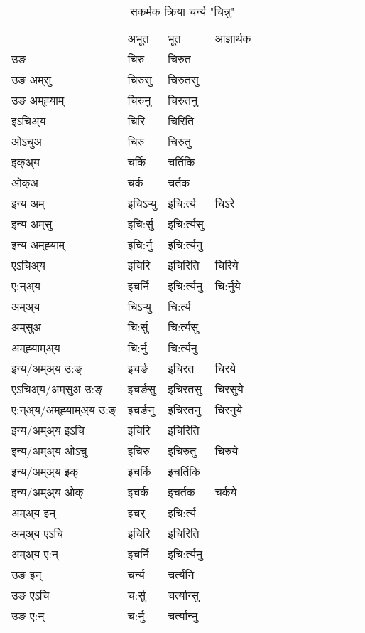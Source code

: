 \begin{table}[H]
\centering
\caption{\label{ir.vt} सकर्मक क्रिया  चर्न्य  "चिन्नु"  }
\begin{tabular}{l|l|l|l|l|l|l|l|l|l|l|l|l}  \toprule
&अभूत & भूत & आज्ञार्थक \\ 
उङ &चिरु &चिरुत \\ 
उङ अम्‌सु &चिरुसु &चिरुतसु \\ 
उङ अम्‌ह्‍याम् &चिरुनु &चिरुतनु \\ 
इऽचिअ्य &चिरि &चिरिति   \\ 
ओऽचुअ &चिरु &चिरुतु   \\ 
इक्अ्य &चर्कि &चर्तिकि   \\ 
ओक्अ &चर्क &चर्तक   \\ 
इन्य अम् & इचिऽर्‍यु  & इचि:र्त्य &चिऽरे  \\ 
इन्य अम्‌सु & इचि:र्सु  & इचि:र्त्यसु   \\ 
इन्य अम्‌ह्‍याम् & इचि:र्नु  & इचि:र्त्यनु   \\ 
एऽचिअ्य & इचिरि & इचिरिति &चिरिये    \\ 
ए:न्अ्य & इचर्नि  & इचि:र्त्यनु &चि:र्नुये  \\ 
अम्अ्य & चिऽर्‍यु  & चि:र्त्य  \\ 
अम्‌सुअ & चि:र्सु & चि:र्त्यसु  \\ 
अम्‌ह्‍याम्अ्य & चि:र्नु  & चि:र्त्यनु \\ 
\midrule
इन्य/अम्अ्य उ:ङ्‌&इचर्ङ & इचिरत &चिरये \\ 
एऽचिअ्य/अम्‌सुअ उ:ङ्‌ &इचर्ङसु & इचिरतसु &चिरसुये \\ 
ए:न्अ्य/अम्‌ह्‍याम्अ्य उ:ङ्‌ &इचर्ङनु & इचिरतनु &चिरनुये \\ 
इन्य/अम्अ्य इऽचि & इचिरि & इचिरिति    \\ 
इन्य/अम्अ्य ओऽचु & इचिरु & इचिरुतु  &चिरुये  \\ 
इन्य/अम्अ्य इक् & इचर्कि & इचर्तिकि   \\ 
इन्य/अम्अ्य ओक् & इचर्क & इचर्तक  &चर्कये  \\ 
अम्अ्य इन् & इचर् & इचि:र्त्य   \\ 
अम्अ्य एऽचि & इचिरि & इचिरिति    \\ 
अम्अ्य ए:न् & इचर्नि  & इचि:र्त्यनु  \\ 
\midrule
उङ इन् & चर्न्य  & चर्त्यनि  \\ 
उङ एऽचि & च:र्सु  & चर्त्यान्सु   \\ 
उङ ए:न्& च:र्नु  & चर्त्यान्‍नु   \\ 
\bottomrule
\end{tabular}
\end{table}


